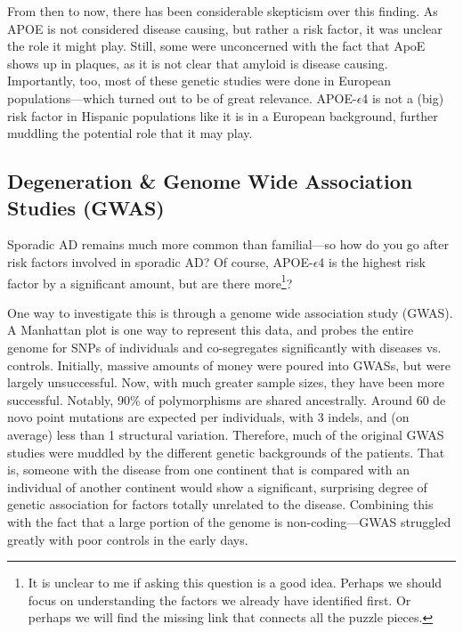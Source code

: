 From then to now, there has been considerable skepticism over this finding. As APOE is not considered disease causing, but rather a risk factor, it was unclear the role it might play. Still, some were unconcerned with the fact that ApoE shows up in plaques, as it is not clear that amyloid is disease causing. Importantly, too, most of these genetic studies were done in European populations---which turned out to be of great relevance. APOE-$\epsilon$4 is not a (big) risk factor in Hispanic populations like it is in a European background, further muddling the potential role that it may play. 


\subsection*{Degeneration \& Genome Wide Association Studies (GWAS)}

Sporadic AD remains much more common than familial---so how do you go after risk factors involved in sporadic AD? Of course, APOE-$\epsilon$4 is the highest risk factor by a significant amount, but are there more\footnote{It is unclear to me if asking this question is a good idea. Perhaps we should focus on understanding the factors we already have identified first. Or perhaps we will find the missing link that connects all the puzzle pieces.}?\newline

One way to investigate this is through a genome wide association study (GWAS). A Manhattan plot is one way to represent this data, and probes the entire genome for SNPs of individuals and co-segregates significantly with diseases vs. controls. Initially, massive amounts of money were poured into GWASs, but were largely unsuccessful. Now, with much greater sample sizes, they have been more successful. Notably, 90\% of polymorphisms are shared ancestrally. Around 60 de novo point mutations are expected per individuals, with 3 indels, and (on average) less than 1 structural variation. Therefore, much of the original GWAS studies were muddled by the different genetic backgrounds of the patients. That is, someone with the disease from one continent that is compared with an individual of another continent would show a significant, surprising degree of genetic association for factors totally unrelated to the disease. Combining this with the fact that a large portion of the genome is non-coding---GWAS struggled greatly with poor controls in the early days.\newline

